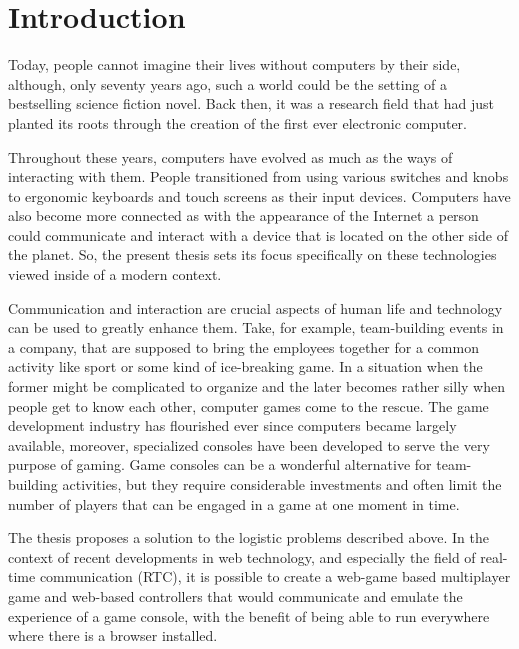 {}
\section*{Introduction}

Today, people cannot imagine their lives without computers by their side,
although, only seventy years ago, such a world could be the setting of a
bestselling science fiction novel. Back then, it was a research field that had
just planted its roots through the creation of the first ever electronic
computer.

Throughout these years, computers have evolved as much as the ways of
interacting with them. People transitioned from using various switches and knobs
to ergonomic keyboards and touch screens as their input devices. Computers have
also become more connected as with the appearance of the Internet a person could
communicate and interact with a device that is located on the other side of the
planet. So, the present thesis sets its focus specifically on these technologies
viewed inside of a modern context.

Communication and interaction are crucial aspects of human life and technology
can be used to greatly enhance them. Take, for example, team-building events in
a company, that are supposed to bring the employees together for a common
activity like sport or some kind of ice-breaking game. In a situation when the
former might be complicated to organize and the later becomes rather silly when
people get to know each other, computer games come to the rescue. The game
development industry has flourished ever since computers became largely
available, moreover, specialized consoles have been developed to serve the very
purpose of gaming. Game consoles can be a wonderful alternative for team-
building activities, but they require considerable investments and often limit
the number of players that can be engaged in a game at one moment in time.

The thesis proposes a solution to the logistic problems described above. In the
context of recent developments in web technology, and especially the field of
real-time communication (RTC), it is possible to create a web-game based
multiplayer game and web-based controllers that would communicate and emulate
the experience of a game console, with the benefit of being able to run
everywhere where there is a browser installed.

